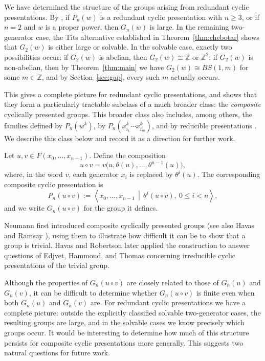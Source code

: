 \documentclass[a4paper,12pt,oneside]{article}
\theoremstyle{definition}
\begin{document}
\medskip

We have determined the structure of the groups arising from redundant cyclic presentations. By \cite[Theorem~4.1]{ChinyereWilliams2023}, if \(P_n(w)\) is a redundant cyclic presentation with \(n\geq 3\), or if \(n=2\) and \(w\) is a proper power, then \(G_n(w)\) is large. In the remaining two-generator case, the Tits alternative established in Theorem~\ref{thm:chebotar} shows that \(G_2(w)\) is either large or solvable. In the solvable case, exactly two possibilities occur: if \(G_2(w)\) is abelian, then \(G_2(w) \cong \mathbb{Z}\) or \(\mathbb{Z}^2\); if \(G_2(w)\) is non-abelian, then by Theorem~\ref{thm:main} we have \(G_2(w) \cong BS(1,m)\) for some \(m \in \mathbb{Z}\), and by Section~\ref{sec:gap}, every such \(m\) actually occurs.

\medskip

This gives a complete picture for redundant cyclic presentations, and shows that they form a particularly tractable subclass of a much broader class: the \emph{composite} cyclically presented groups. This broader class also includes, among others, the families defined by \(P_n(w^k)\), by \(P_n(x_{i_1}^k \cdots x_{i_m}^k)\), and by reducible presentations \cite{ChinyereHowToGeneralize}. We describe this class below and record it as a direction for further work.



\medskip

Let \(u, v \in F(x_0,\ldots,x_{n-1})\). Define the composition
$$
u \circ v
=
v\bigl(u, \theta(u), \ldots, \theta^{n-1}(u)\bigr),
$$
where, in the word \(v\), each generator \(x_i\) is replaced by \(\theta^i(u)\). The corresponding composite cyclic presentation is
$$
P_n(u \circ v)
:=
\left\langle
x_0, \ldots, x_{n-1}
\,\middle|\,
\theta^i(u \circ v),\ 0 \leq i < n
\right\rangle,
$$
and we write \(G_n(u \circ v)\) for the group it defines.
\medskip

Neumann first introduced composite cyclically presented groups \cite{Neumann1979} (see also Havas and Ramsay \cite{HavasRamsay2000}), using them to illustrate how difficult it can be to show that a group is trivial. Havas and Robertson \cite{HavasRobertson2003} later applied the construction to answer questions of Edjvet, Hammond, and Thomas \cite{EdjvetHammondThomas2001} concerning irreducible cyclic presentations of the trivial group. 
\medskip

Although the properties of \(G_n(u \circ v)\) are closely related to those of \(G_n(u)\) and \(G_n(v)\), it can be difficult to determine whether \(G_n(u \circ v)\) is finite even when both \(G_n(u)\) and \(G_n(v)\) are. For redundant cyclic presentations we have a complete picture: outside the explicitly classified solvable two-generator cases, the resulting groups are large, and in the solvable cases we know precisely which groups occur. It would be interesting to determine how much of this structure persists for composite cyclic presentations more generally. This suggests two natural questions for future work.
\end{document}
